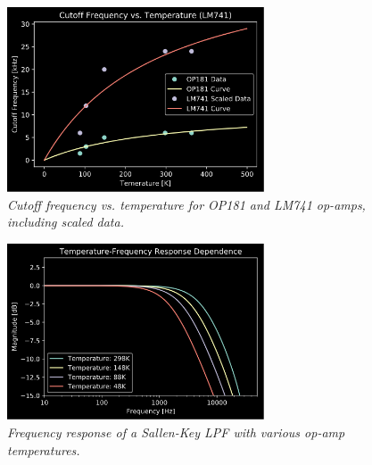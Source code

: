 \documentclass[twoside,a4paper]{article}
\begin{document}
\begin{figure}[h]
    \center
    \includegraphics[width=3in]{../OpAmp/Pics/freq_temp_shift.png}
    \caption{\label{opamp-temp}{\it Cutoff frequency vs. temperature for
        OP181 and LM741 op-amps, including scaled data.}}
\end{figure}
%
\begin{figure}[h]
    \center
    \includegraphics[width=3in]{../OpAmp/Pics/temp_freq_response.png}
    \caption{\label{opamp-temp-freq}{\it Frequency response of a Sallen-Key
        LPF with various op-amp temperatures.}}
\end{figure}
%
\end{document}
